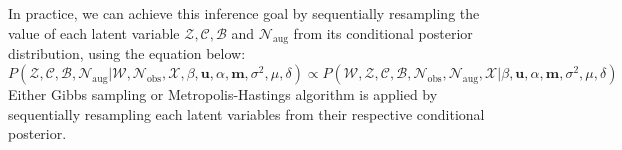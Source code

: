 \documentclass[a4paper]{article}
\begin{document}
In practice, we can achieve this inference goal by sequentially resampling the value of each latent variable $\mathcal{Z}, \mathcal{C}, \mathcal{B}$ and $\mathcal{N}_{\mbox{aug}}$ from its conditional posterior distribution, using the equation below:
 \begin{equation}
 P( \mathcal{Z}, \mathcal{C}, \mathcal{B}, \mathcal{N}_{\mbox{aug}}|\mathcal{W}, \mathcal{N}_{\mbox{obs}}, \mathcal{X}, \beta, \boldsymbol{u}, \alpha, \boldsymbol{m}, \sigma^2, \mu, \delta) \propto P(\mathcal{W},  \mathcal{Z}, \mathcal{C}, \mathcal{B}, \mathcal{N}_{\mbox{obs}}, \mathcal{N}_{\mbox{aug}}, \mathcal{X} |\beta, \boldsymbol{u}, \alpha, \boldsymbol{m}, \sigma^2, \mu, \delta)
 \end{equation}
 Either Gibbs sampling or Metropolis-Hastings algorithm is applied by sequentially resampling each latent variables from their respective conditional posterior.
\end{document}
